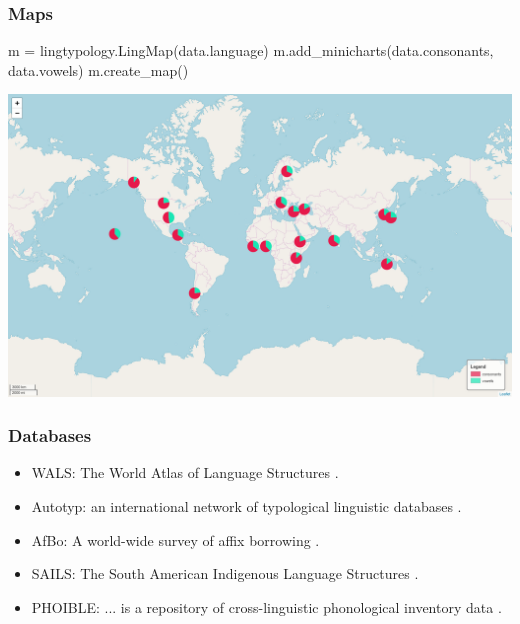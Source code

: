 \documentclass{beamer}
\begin{document}
\begin{frame}[fragile]
\frametitle{Maps}
\begin{python}
m = lingtypology.LingMap(data.language)
m.add_minicharts(data.consonants, data.vowels)
m.create_map()
\end{python}
\includegraphics[width=\textwidth]{images/MinichartsMap.png}
\end{frame}

\begin{frame}
\frametitle{Databases}
\begin{itemize}
 \item WALS: The World Atlas of Language Structures \parencite{wals}.
 \item Autotyp: an international network of typological linguistic databases \parencite{autotyp}.
 \item AfBo: A world-wide survey of affix borrowing \parencite{afbo}.
 \item SAILS: The South American Indigenous Language Structures \parencite{sails}.
 \item PHOIBLE: ... is a repository of cross-linguistic phonological inventory data \parencite{phoible}.
\end{itemize}
\end{frame}
\end{document}
